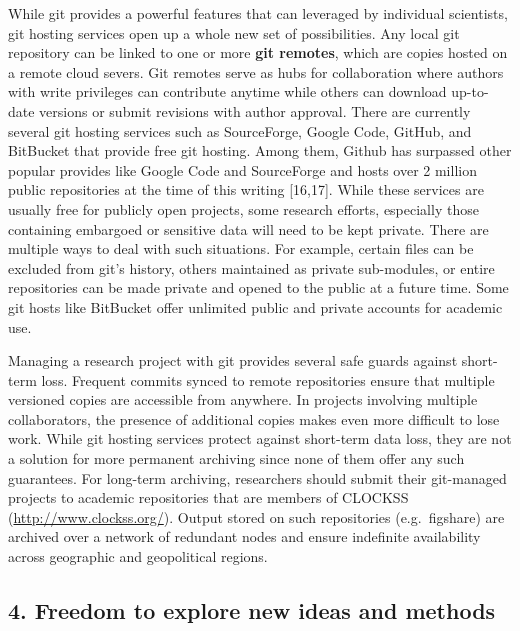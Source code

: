 \documentclass[]{article}
\begin{document}
While git provides a powerful features that can leveraged by individual
scientists, git hosting services open up a whole new set of
possibilities. Any local git repository can be linked to one or more
\textbf{git remotes}, which are copies hosted on a remote cloud severs.
Git remotes serve as hubs for collaboration where authors with write
privileges can contribute anytime while others can download up-to-date
versions or submit revisions with author approval. There are currently
several git hosting services such as SourceForge, Google Code, GitHub,
and BitBucket that provide free git hosting. Among them, Github has
surpassed other popular provides like Google Code and SourceForge and
hosts over 2 million public repositories at the time of this writing
{[}16,17{]}. While these services are usually free for publicly open
projects, some research efforts, especially those containing embargoed
or sensitive data will need to be kept private. There are multiple ways
to deal with such situations. For example, certain files can be excluded
from git's history, others maintained as private sub-modules, or entire
repositories can be made private and opened to the public at a future
time. Some git hosts like BitBucket offer unlimited public and private
accounts for academic use.

Managing a research project with git provides several safe guards
against short-term loss. Frequent commits synced to remote repositories
ensure that multiple versioned copies are accessible from anywhere. In
projects involving multiple collaborators, the presence of additional
copies makes even more difficult to lose work. While git hosting
services protect against short-term data loss, they are not a solution
for more permanent archiving since none of them offer any such
guarantees. For long-term archiving, researchers should submit their
git-managed projects to academic repositories that are members of
CLOCKSS (\href{http://www.clockss.org/}{http://www.clockss.org/}).
Output stored on such repositories (e.g.~figshare) are archived over a
network of redundant nodes and ensure indefinite availability across
geographic and geopolitical regions.

\subsection{4. Freedom to explore new ideas and methods}
\end{document}
